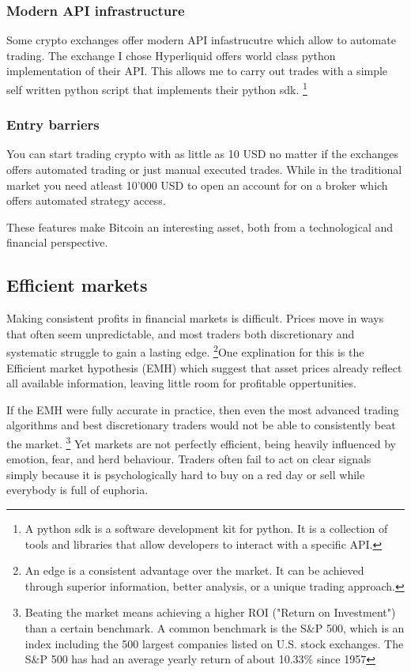 \documentclass[12pt]{article}
\begin{document}
\subsubsection*{Modern API infrastructure}
Some crypto exchanges offer modern API infastrucutre which allow to automate trading. The exchange I chose Hyperliquid offers world class python implementation of their API. This allows me to carry out trades with a simple self written python script that implements their python sdk. \footnote{A python sdk is a software development kit for python. It is a collection of tools and libraries that allow developers to interact with a specific API.}



\subsubsection*{Entry barriers}
You can start trading crypto with as little as 10 USD no matter if the exchanges offers automated trading or just manual executed trades. While in the traditional market you need atleast 10'000 USD to open an account for on a broker which offers automated strategy access.



These features make Bitcoin an interesting asset, both from a technological and financial perspective.




\newpage
\subsection{Efficient markets}
Making consistent profits in financial markets is difficult. Prices move in ways that often seem unpredictable, and most traders both discretionary and systematic struggle to gain a lasting edge. \footnote[1]{An edge is a consistent advantage over the market. It can be achieved through superior information, better analysis, or a unique trading approach.}One explination for this is the Efficient market hypothesis (EMH) which suggest that asset prices already reflect all available information, leaving little room for profitable oppertunities.






If the EMH were fully accurate in practice, then even the most advanced trading algorithms and best discretionary traders would not be able to consistently beat the market. \footnote[2]{Beating the market means achieving a higher ROI ("Return on Investment") than a certain benchmark. A common benchmark is the S\&P 500, which is an index including the 500 largest companies listed on U.S. stock exchanges. The S\&P 500 has had an average yearly return of about 10.33\% since 1957} Yet markets are not perfectly efficient, being heavily influenced by emotion, fear, and herd behaviour. Traders often fail to act on clear signals simply because it is psychologically hard to buy on a red day or sell while everybody is full of euphoria.
\end{document}
